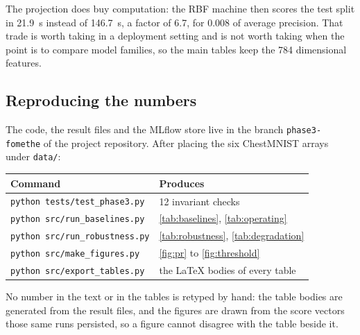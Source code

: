 The projection does buy computation: the RBF machine then scores the test split
in \SI{21.9}{\second} instead of \SI{146.7}{\second}, a factor of \num{6.7}, for
\num{0.008} of average precision. That trade is worth taking in a deployment
setting and is not worth taking when the point is to compare model families, so
the main tables keep the \num{784} dimensional features.

\subsection{Reproducing the numbers}
\label{sec:appendix-repro}

The code, the result files and the MLflow store live in the branch
\texttt{phase3-fomethe} of the project repository. After placing the six
ChestMNIST arrays under \texttt{data/}:

\begin{center}
\footnotesize
\begin{tabular}{@{}ll@{}}
\toprule
Command & Produces \\
\midrule
\texttt{python tests/test\_phase3.py}  & \num{12} invariant checks \\
\texttt{python src/run\_baselines.py}  & \cref{tab:baselines}, \cref{tab:operating} \\
\texttt{python src/run\_robustness.py} & \cref{tab:robustness}, \cref{tab:degradation} \\
\texttt{python src/make\_figures.py}   & \cref{fig:pr} to \cref{fig:threshold} \\
\texttt{python src/export\_tables.py}  & the LaTeX bodies of every table \\
\bottomrule
\end{tabular}
\end{center}

\noindent
No number in the text or in the tables is retyped by hand: the table bodies are
generated from the result files, and the figures are drawn from the score
vectors those same runs persisted, so a figure cannot disagree with the table
beside it.
